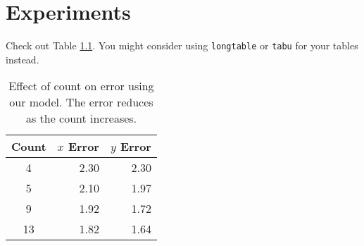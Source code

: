 \chapter{Experiments}
\label{ch:experiments}

Check out Table \ref{tbl:calibration}. You might consider using
\texttt{longtable} or \texttt{tabu} for your tables instead.

\begin{table}
  \centering
  \small
  \begin{tabular}{crr}
    \hline
    Count & $x$ Error & $y$ Error\\\hline\hline
    4 & 2.30 & 2.30\\\hline
    5 & 2.10 & 1.97\\\hline
    9 & 1.92 & 1.72\\\hline
    13 & 1.82 & 1.64\\\hline
  \end{tabular}
  \caption[Effect of count on error]
    {Effect of count on error using our model. The error reduces as the count
    increases.}
  \label{tbl:calibration}
\end{table}

\lipsum